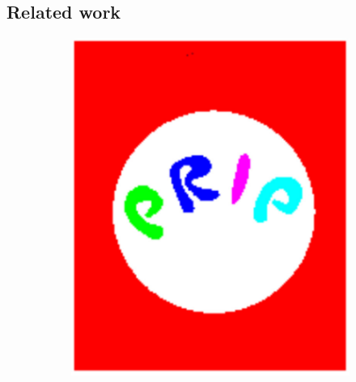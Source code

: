 \documentclass[12pt]{article}
\begin{document}
\subsection{Related work}%
\label{sub:related_work}

\begin{figure}[tb]
  \centering

  \begin{subfigure}[b]{0.25\textwidth}
        \includegraphics[width=\textwidth]{img/prip1}
        \caption{}\label{fig:prip1}
    \end{subfigure}~%
    \begin{subfigure}[b]{0.25\textwidth}

\end{subfigure}
\end{figure}
\end{document}
